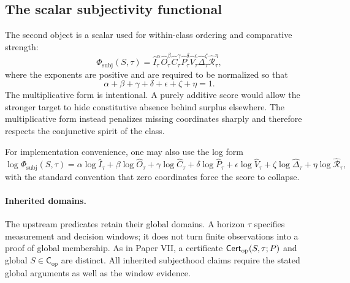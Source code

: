 \documentclass[11pt,a4paper]{article}
\theoremstyle{definition}
\newcommand{\Cop}{\mathsf{C}_{\mathrm{op}}}
\newcommand{\SelfIndex}{I}
\newcommand{\OwnField}{O}
\newcommand{\ContField}{C}
\newcommand{\Persp}{P}
\newcommand{\ValAsym}{V}
\newcommand{\IntervProf}{\Delta}
\newcommand{\Irred}{\mathcal{R}}
\newcommand{\PhiSubj}{\Phi_{\mathrm{subj}}}
\begin{document}
\subsection{The scalar subjectivity functional}
The second object is a scalar used for within-class ordering and comparative strength:
\[
\PhiSubj(S,\tau)=
\widehat{\SelfIndex}_\tau^{\alpha}
\widehat{\OwnField}_\tau^{\beta}
\widehat{\ContField}_\tau^{\gamma}
\widehat{\Persp}_\tau^{\delta}
\widehat{\ValAsym}_\tau^{\epsilon}
\widehat{\IntervProf}_\tau^{\zeta}
\widehat{\Irred}_\tau^{\eta},
\]
where the exponents are positive and are required to be normalized so that
\[
\alpha+\beta+\gamma+\delta+\epsilon+\zeta+\eta=1.
\]
The multiplicative form is intentional. A purely additive score would allow the stronger target to hide constitutive absence behind surplus elsewhere. The multiplicative form instead penalizes missing coordinates sharply and therefore respects the conjunctive spirit of the class.

For implementation convenience, one may also use the log form
\[
\log \PhiSubj(S,\tau)=
\alpha\log \widehat{\SelfIndex}_\tau+
\beta\log \widehat{\OwnField}_\tau+
\gamma\log \widehat{\ContField}_\tau+
\delta\log \widehat{\Persp}_\tau+
\epsilon\log \widehat{\ValAsym}_\tau+
\zeta\log \widehat{\IntervProf}_\tau+
\eta\log \widehat{\Irred}_\tau,
\]
with the standard convention that zero coordinates force the score to collapse.

\paragraph{Inherited domains.}
The upstream predicates retain their global domains. A horizon $\tau$ specifies measurement and decision windows; it does not turn finite observations into a proof of global membership. As in Paper VII, a certificate $\mathsf{Cert}_{\rm op}(S,\tau;P)$ and global $S\in\Cop$ are distinct. All inherited subjecthood claims require the stated global arguments as well as the window evidence.
\end{document}
